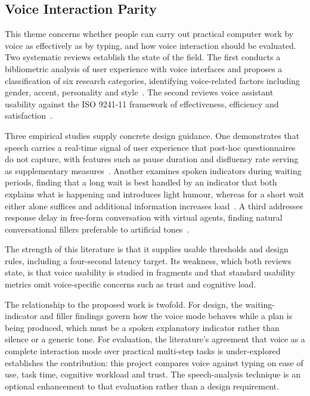 \documentclass{FastFyp}
\begin{document}
\subsection{Voice Interaction Parity}
This theme concerns whether people can carry out practical computer work by voice as effectively as by typing, and how voice interaction should be evaluated. Two systematic reviews establish the state of the field. The first conducts a bibliometric analysis of user experience with voice interfaces and proposes a classification of six research categories, identifying voice-related factors including gender, accent, personality and style~\cite{ref:deshmukh2024}. The second reviews voice assistant usability against the ISO 9241-11 framework of effectiveness, efficiency and satisfaction~\cite{ref:dutsinma2022}.

Three empirical studies supply concrete design guidance. One demonstrates that speech carries a real-time signal of user experience that post-hoc questionnaires do not capture, with features such as pause duration and disfluency rate serving as supplementary measures~\cite{ref:ma2026}. Another examines spoken indicators during waiting periods, finding that a long wait is best handled by an indicator that both explains what is happening and introduces light humour, whereas for a short wait either alone suffices and additional information increases load~\cite{ref:zhang2025}. A third addresses response delay in free-form conversation with virtual agents, finding natural conversational fillers preferable to artificial tones~\cite{ref:wang2025}.

The strength of this literature is that it supplies usable thresholds and design rules, including a four-second latency target. Its weakness, which both reviews state, is that voice usability is studied in fragments and that standard usability metrics omit voice-specific concerns such as trust and cognitive load.

The relationship to the proposed work is twofold. For design, the waiting-indicator and filler findings govern how the voice mode behaves while a plan is being produced, which must be a spoken explanatory indicator rather than silence or a generic tone. For evaluation, the literature's agreement that voice as a complete interaction mode over practical multi-step tasks is under-explored establishes the contribution: this project compares voice against typing on ease of use, task time, cognitive workload and trust. The speech-analysis technique is an optional enhancement to that evaluation rather than a design requirement.
\end{document}

